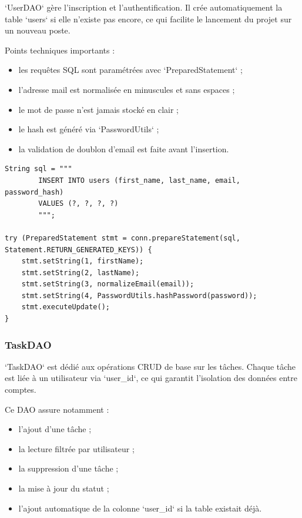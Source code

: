 \documentclass[11pt,a4paper]{article}
\begin{document}
`UserDAO` gère l'inscription et l'authentification. Il crée automatiquement la table `users` si elle n'existe pas encore, ce qui facilite le lancement du projet sur un nouveau poste.

Points techniques importants :
\begin{itemize}[leftmargin=1.4em]
    \item les requêtes SQL sont paramétrées avec `PreparedStatement` ;
    \item l'adresse mail est normalisée en minuscules et sans espaces ;
    \item le mot de passe n'est jamais stocké en clair ;
    \item le hash est généré via `PasswordUtils` ;
    \item la validation de doublon d'email est faite avant l'insertion.
\end{itemize}

\begin{lstlisting}[style=javaStyle,caption={Création d'un compte utilisateur}]
String sql = """
        INSERT INTO users (first_name, last_name, email, password_hash)
        VALUES (?, ?, ?, ?)
        """;

try (PreparedStatement stmt = conn.prepareStatement(sql, Statement.RETURN_GENERATED_KEYS)) {
    stmt.setString(1, firstName);
    stmt.setString(2, lastName);
    stmt.setString(3, normalizeEmail(email));
    stmt.setString(4, PasswordUtils.hashPassword(password));
    stmt.executeUpdate();
}
\end{lstlisting}

\subsubsection{TaskDAO}

`TaskDAO` est dédié aux opérations CRUD de base sur les tâches. Chaque tâche est liée à un utilisateur via `user_id`, ce qui garantit l'isolation des données entre comptes.

Ce DAO assure notamment :
\begin{itemize}[leftmargin=1.4em]
    \item l'ajout d'une tâche ;
    \item la lecture filtrée par utilisateur ;
    \item la suppression d'une tâche ;
    \item la mise à jour du statut ;
    \item l'ajout automatique de la colonne `user_id` si la table existait déjà.
\end{itemize}
\end{document}
